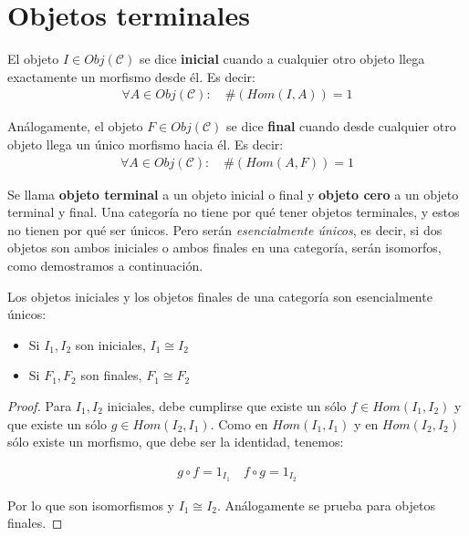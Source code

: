 \documentclass[11pt, fleqn, spanish]{book}
\newcommand{\C}{\mathcal{C}}
\begin{document}
\section {Objetos terminales}
\begin{definition}
  El objeto $I \in Obj(\C)$ se dice \textbf{inicial} cuando a cualquier otro objeto llega
  exactamente un morfismo desde él. Es decir:
  \begin{gather*}
    \forall A \in Obj(\C):\quad \#(Hom(I,A)) = 1
  \end{gather*}
\end{definition}

\begin{definition}
  Análogamente, el objeto $F \in Obj(\C)$ se dice \textbf{final}
  cuando desde cualquier otro objeto llega un único morfismo hacia
  él. Es decir:
  \begin{gather*}
    \forall A \in Obj(\C):\quad \#(Hom(A,F)) = 1
  \end{gather*}
\end{definition}
   
Se llama \textbf{objeto terminal} a un objeto inicial o final y
\textbf{objeto cero} a un objeto terminal y final. Una categoría no
tiene por qué tener objetos terminales, y estos no tienen por qué ser
únicos. Pero serán \textit{esencialmente únicos}, es decir, si dos
objetos son ambos iniciales o ambos finales en una categoría, serán
isomorfos, como demostramos a continuación.
    
\begin{theorem} Los objetos iniciales y los objetos finales de una
  categoría son esencialmente únicos:
  \begin{itemize}
  \item Si $I_1,I_2$ son iniciales, $I_1 \cong I_2$
  \item Si $F_1,F_2$ son finales, $F_1 \cong F_2$
  \end{itemize}
\end{theorem}

\begin{proof}
  Para $I_1,I_2$ iniciales, debe cumplirse que existe un sólo
  $f \in Hom(I_1,I_2)$ y que existe un sólo $g \in Hom(I_2,I_1)$. Como
  en $Hom(I_1,I_1)$ y en $Hom(I_2,I_2)$ sólo existe un morfismo, que
  debe ser la identidad, tenemos:
  
  \begin{gather*}
    g \circ f = 1_{I_1} \quad f \circ g = 1_{I_2}
  \end{gather*}
  
  Por lo que son isomorfismos y $I_1 \cong I_2$. Análogamente se prueba para objetos finales.
\end{proof}
    
\end{document}
